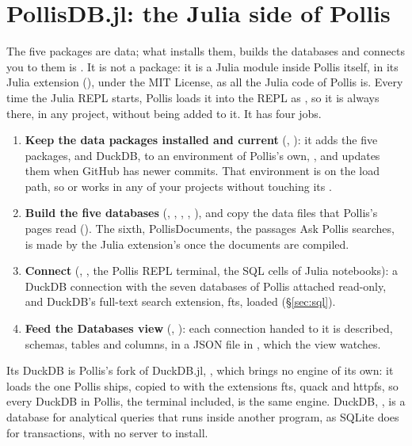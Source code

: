 \section{\texorpdfstring{PollisDB.jl}{PollisDB.jl}: the Julia side of Pollis}\label{sec:pollisdb}

The five packages are data; what installs them, builds the databases and connects you to them is
. It is not a package: it is a Julia module inside Pollis itself, in its Julia extension
(), under the MIT License, as all the Julia code of Pollis is. Every time
the Julia REPL starts, Pollis loads it into the REPL as , so it is always there, in any project, without
being added to it. It has four jobs.
\begin{enumerate}
  \item \textbf{Keep the data packages installed and current} (, ): it adds
    the five packages, and DuckDB, to an environment of Pollis's own, , and
    updates them when GitHub has newer commits. That environment is on the load path, so  or
     works in any of your projects without touching its .
  \item \textbf{Build the five databases} (, , ,
    , ), and copy the data files that Pollis's pages read
    (). The sixth, PollisDocuments, the passages Ask Pollis searches, is made by the Julia extension's  once the
    documents are compiled.
  \item \textbf{Connect} (, , the Pollis REPL terminal, the SQL cells of Julia notebooks): a
    DuckDB connection with the seven databases of Pollis attached read-only, and DuckDB's full-text search extension,
    fts, loaded (\S\ref{sec:sql}).
  \item \textbf{Feed the Databases view} (, ): each connection handed to it is
    described, schemas, tables and columns, in a JSON file in , which the view
    watches.
\end{enumerate}
Its DuckDB is Pollis's fork of DuckDB.jl, , which brings no engine of its own:
it loads the one Pollis ships, copied to  with the extensions fts, quack and httpfs, so every DuckDB in Pollis,
the  terminal included, is the same engine. DuckDB, ,
is a database for analytical queries that runs inside another program, as SQLite does for transactions, with no
server to install.


